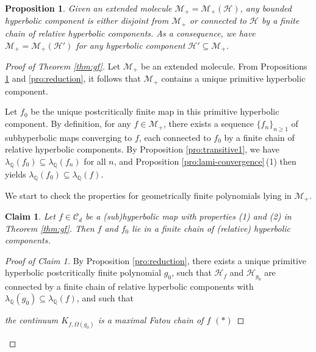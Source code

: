\documentclass[a4paper,reqno,times, 11pt]{amsart}
\newtheorem{proposition}[theorem]{Proposition}
\theoremstyle{remark}
\theoremstyle{plain}
\numberwithin{equation}{section}
\def\MMMM{{\cal M}}
\def\MMMM{\mathscr M}
\def\HHHH{\mathscr H}
\def\CCCC{\mathscr C}
\def\Q{\mathbb Q}
\def\cal{\mathcal}
\begin{document}
	\begin{proposition}\label{pro:def}
	Given an extended molecule $\MMMM_+=\MMMM_+(\HHHH)$, any bounded hyperbolic component is either disjoint from $\MMMM_+$ or connected to $\HHHH$ by a finite chain of relative hyperbolic components. As a consequence, we have $\MMMM_+=\MMMM_+(\HHHH')$ for any hyperbolic component $\HHHH'\subseteq\MMMM_+$.
	\end{proposition}
	
\begin{proof}[Proof of Theorem \ref{thm:gf}]
	Let $\MMMM_+$ be an extended molecule. From Propositions \ref{pro:def} and \ref{pro:reduction}, it follows that $\MMMM_+$ contains a unique primitive hyperbolic component.
	
	Let $f_0$ be the unique postcritically finite map in this primitive hyperbolic component.
	By definition, for any $f\in\MMMM_+$, there exists a sequence $\{f_n\}_{n\geq1}$ of subhyperbolic maps converging to $f$, each connected to $f_0$ by a finite chain of relative hyperbolic components. By Proposition \ref{pro:transitive1}, we have $\lambda_\Q(f_0)\subseteq \lambda_\Q(f_n)$ for all $n$, and Proposition  \ref{pro:lami-convergence}\,(1) then yields $\lambda_\Q(f_0)\subseteq \lambda_\Q(f)$. \vspace{4pt}
	
	We start to check the  properties for  geometrically finite polynomials lying in $\MMMM_+$. \vspace{5pt}
	
	{\bf Claim 1}. \emph{Let $f\in\CCCC_d$ be a (sub)hyperbolic map with properties (1) and (2) in Theorem \ref{thm:gf}. Then $f$ and $f_0$ lie in  a finite chain of (relative) hyperbolic components.}
	
	\begin{proof}[Proof of Claim 1]
		
		By Proposition \ref{pro:reduction}, there exists a unique primitive hyperbolic postcritically finite polynomial $g_0$, such that $\HHHH_f$ and $\HHHH_{g_0}$ are connected by a finite chain of relative hyperbolic components with $\lambda_\Q(g_0)\subseteq\lambda_\Q(f)$, and such that
		\vspace{5pt}
		
		\qquad \quad \qquad\qquad\emph{the continuum $K_{f,\Omega(g_0)}$ is  a maximal Fatou chain of $f$ \quad\qquad\qquad\qquad$(\ast)$}
		\vspace{5pt}
		

\end{proof}
\end{proof}
\end{document}
